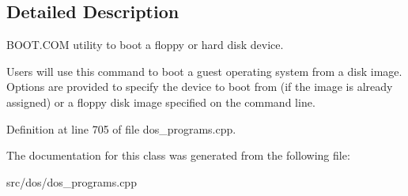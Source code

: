 \subsection{Detailed Description}
B\-O\-O\-T.\-C\-O\-M utility to boot a floppy or hard disk device. 

Users will use this command to boot a guest operating system from a disk image. Options are provided to specify the device to boot from (if the image is already assigned) or a floppy disk image specified on the command line. 

Definition at line 705 of file dos\-\_\-programs.\-cpp.



The documentation for this class was generated from the following file\-:\begin{DoxyCompactItemize}
\item 
src/dos/dos\-\_\-programs.\-cpp\end{DoxyCompactItemize}
